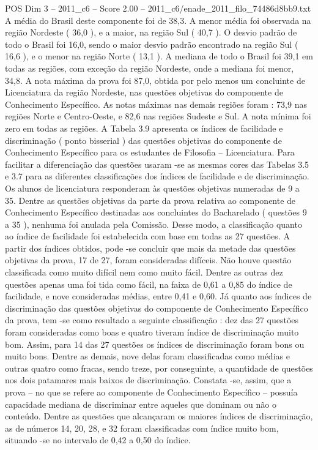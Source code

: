 \begin{textsample}{POS Dim 3 – 2011\_c6 – Score 2.00 – 2011\_c6/enade\_2011\_filo\_74486d8bb9.txt}
A média do Brasil deste componente foi de 38,3.
A menor média foi observada na região Nordeste ( 36,0 ), e a maior, na região Sul ( 40,7 ).
O desvio padrão de todo o Brasil foi 16,0, sendo o maior desvio padrão encontrado na região Sul ( 16,6 ), e o menor na região Norte ( 13,1 ).
A mediana de todo o Brasil foi 39,1 em todas as regiões, com exceção da região Nordeste, onde a mediana foi menor, 34,8.
A nota máxima da prova foi 87,0, obtida por pelo menos um concluinte de Licenciatura da região Nordeste, nas questões objetivas do componente de Conhecimento Específico.
As notas máximas nas demais regiões foram : 73,9 nas regiões Norte e Centro-Oeste, e 82,6 nas regiões Sudeste e Sul.
A nota mínima foi zero em todas as regiões.
A Tabela 3.9 apresenta os índices de facilidade e discriminação ( ponto bisserial ) das questões objetivas do componente de Conhecimento Específico para os estudantes de Filosofia – Licenciatura.
Para facilitar a diferenciação das questões usaram -se as mesmas cores das Tabelas 3.5 e 3.7 para as diferentes classificações dos índices de facilidade e de discriminação.
Os alunos de licenciatura responderam às questões objetivas numeradas de 9 a 35.
Dentre as questões objetivas da parte da prova relativa ao componente de Conhecimento Específico destinadas aos concluintes do Bacharelado ( questões 9 a 35 ), nenhuma foi anulada pela Comissão.
Desse modo, a classificação quanto ao índice de facilidade foi estabelecida com base em todas as 27 questões.
A partir dos índices obtidos, pode -se concluir que mais da metade das questões objetivas da prova, 17 de 27, foram consideradas difíceis.
Não houve questão classificada como muito difícil nem como muito fácil.
Dentre as outras dez questões apenas uma foi tida como fácil, na faixa de 0,61 a 0,85 do índice de facilidade, e nove consideradas médias, entre 0,41 e 0,60.
Já quanto aos índices de discriminação das questões objetivas do componente de Conhecimento Específico da prova, tem -se como resultado a seguinte classificação : dez das 27 questões foram consideradas como boas e quatro tiveram índice de discriminação muito bom.
Assim, para 14 das 27 questões os índices de discriminação foram bons ou muito bons.
Dentre as demais, nove delas foram classificadas como médias e outras quatro como fracas, sendo treze, por conseguinte, a quantidade de questões nos dois patamares mais baixos de discriminação.
Constata -se, assim, que a prova – no que se refere ao componente de Conhecimento Específico – possuía capacidade mediana de discriminar entre aqueles que dominam ou não o conteúdo.
Dentre as questões que alcançaram os maiores índices de discriminação, as de números 14, 20, 28, e 32 foram classificadas com índice muito bom, situando -se no intervalo de 0,42 a 0,50 do índice.

\end{textsample}
